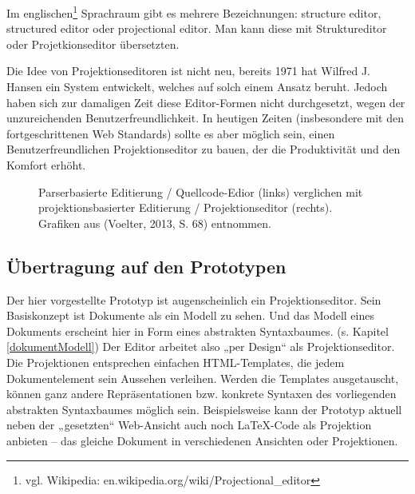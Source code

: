  
Im englischen\footnote{vgl. Wikipedia: en.wikipedia.org/wiki/Projectional\_editor} Sprachraum gibt es mehrere Bezeichnungen: structure editor, structured editor oder projectional editor. Man kann diese mit Struktureditor oder Projetkionseditor übersetzten.

 
Die Idee von Projektionseditoren ist nicht neu, bereits 1971 hat Wilfred J. Hansen ein System entwickelt, welches auf solch einem Ansatz beruht. Jedoch haben sich zur damaligen Zeit diese Editor-Formen nicht durchgesetzt, wegen der unzureichenden Benutzerfreundlichkeit. \citep[S.~91]{Gomolka} In heutigen Zeiten (insbesondere mit den fortgeschrittenen Web Standards) sollte es aber möglich sein, einen Benutzerfreundlichen Projektionseditor zu bauen, der die Produktivität und den Komfort erhöht.

 
\begin{figure}[h!]
\centering
\advance\leftskip-2.5cm
\caption{ Parserbasierte Editierung / Quellcode-Edior (links) verglichen mit projektionsbasierter Editierung / Projektionseditor (rechts). Grafiken aus (Voelter, 2013, S. 68) entnommen. }\label{parserprojectional}
\end{figure}
 
\subsection{Übertragung auf den Prototypen}\label{}
 
Der hier vorgestellte Prototyp ist augenscheinlich ein Projektionseditor. Sein Basiskonzept ist Dokumente als ein Modell zu sehen. Und das Modell eines Dokuments erscheint hier in Form eines abstrakten Syntaxbaumes. (s. Kapitel \ref{dokumentModell}) Der Editor arbeitet also „per Design“ als Projektionseditor. Die Projektionen entsprechen einfachen HTML-Templates, die jedem Dokumentelement sein Aussehen verleihen. Werden die Templates ausgetauscht, können ganz andere Repräsentationen bzw. konkrete Syntaxen des vorliegenden abstrakten Syntaxbaumes möglich sein. Beispielsweise kann der Prototyp aktuell neben der „gesetzten“ Web-Ansicht auch noch LaTeX-Code als Projektion anbieten -- das gleiche Dokument in verschiedenen Ansichten oder Projektionen.

